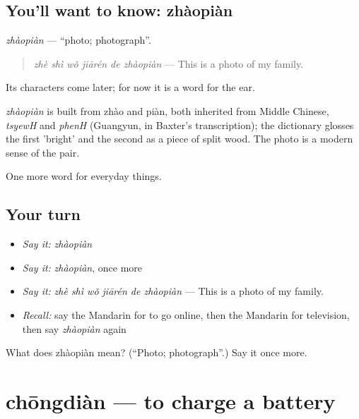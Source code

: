 \subsection*{You'll want to know: zhàopiàn}
\emph{zhàopiàn} — \textquotedblleft{}photo; photograph\textquotedblright{}.

\begin{quote}
\emph{zhè shì wǒ jiārén de zhàopiàn} — This is a photo of my family.
\end{quote}

Its characters come later; for now it is a word for the ear.

\begin{cousinweb}
\emph{zhàopiàn} is built from zhào and piàn, both inherited from Middle Chinese, \emph{tsyewH} and \emph{phenH} (Guangyun, in Baxter's transcription); the dictionary glosses the first 'bright' and the second as a piece of split wood. The photo is a modern sense of the pair.
\end{cousinweb}

\begin{grammarlens}[title={What you've built}]
One more word for everyday things.
\end{grammarlens}

\subsection*{Your turn}
\begin{itemize}
\raggedright
  \item \emph{Say it:} \emph{zhàopiàn}
  \item \emph{Say it:} \emph{zhàopiàn}, once more
  \item \emph{Say it:} \emph{zhè shì wǒ jiārén de zhàopiàn} — This is a photo of my family.
  \item \emph{Recall:} say the Mandarin for to go online, then the Mandarin for television, then say \emph{zhàopiàn} again
\end{itemize}

\begin{tcolorbox}[breakable,colback=teal!4,colframe=teal!35!black,title={Before you move on}]
What does zhàopiàn mean? (\textquotedblleft{}Photo; photograph\textquotedblright{}.) Say it once more.
\end{tcolorbox}
\section[chōngdiàn]{chōngdiàn — to charge a battery}

